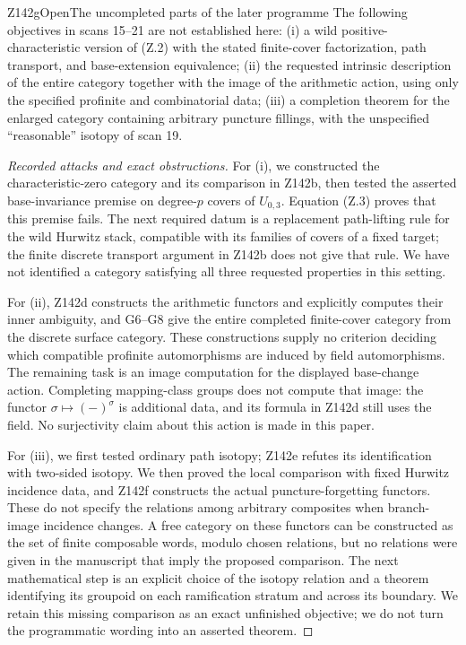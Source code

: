 \begin{result}{Z142g}{Open}{The uncompleted parts of the later programme}
The following objectives in scans 15--21 are not established here:
(i) a wild positive-characteristic version of (Z.2) with the stated
finite-cover factorization, path transport, and base-extension
equivalence; (ii) the requested intrinsic description of the entire
category together with the image of the arithmetic action, using
only the specified profinite and combinatorial data; (iii) a
completion theorem for the enlarged category containing arbitrary
puncture fillings, with the unspecified ``reasonable'' isotopy of
scan 19.
\end{result}
\begin{proof}[Recorded attacks and exact obstructions]
For (i), we constructed the characteristic-zero category and its
comparison in Z142b, then tested the asserted base-invariance premise
on degree-$p$ covers of $U_{0,3}$. Equation (Z.3) proves that this
premise fails. The next required datum is a replacement path-lifting
rule for the wild Hurwitz stack, compatible with its families of
covers of a fixed target; the finite discrete transport argument in
Z142b does not give that rule. We have not identified a category
satisfying all three requested properties in this setting.

For (ii), Z142d constructs the arithmetic functors and explicitly
computes their inner ambiguity, and G6--G8 give the entire completed
finite-cover category from the discrete surface category. These
constructions supply no criterion deciding which compatible
profinite automorphisms are induced by field automorphisms. The
remaining task is an image computation for the displayed base-change
action. Completing mapping-class groups does not compute that image:
the functor $\sigma\mapsto(-)^\sigma$ is additional data, and its
formula in Z142d still uses the field. No surjectivity claim about
this action is made in this paper.

For (iii), we first tested ordinary path isotopy; Z142e refutes its
identification with two-sided isotopy. We then proved the local
comparison with fixed Hurwitz incidence data, and Z142f constructs
the actual puncture-forgetting functors. These do not specify the
relations among arbitrary composites when branch-image incidence
changes. A free category on these functors can be constructed as the
set of finite composable words, modulo chosen relations, but no
relations were given in the manuscript that imply the proposed
comparison. The next mathematical step is an explicit choice of the
isotopy relation and a theorem identifying its groupoid on each
ramification stratum and across its boundary. We retain this missing
comparison as an exact unfinished objective; we do not turn the
programmatic wording into an asserted theorem.
\end{proof}
